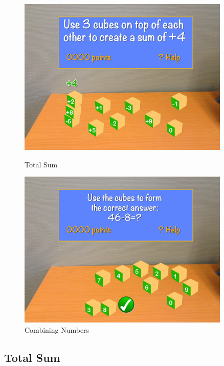 \begin{figure}[h]
	\capstart
	\centering
	\begin{minipage}{.5\textwidth}
		\capstart
		\centering
		\includegraphics[width=0.9\textwidth]{images/Costas/game_mockup2(arithmetic).jpg}
		\vspace{-10pt}
		\caption{Total Sum}
		\label{fig:Costas_total_sum}
	\end{minipage}%
	\begin{minipage}{.5\textwidth}
		\capstart
		\centering
		\includegraphics[width=0.9\textwidth]{images/Costas/game_mockup2(arithmetic2).jpg}
		\vspace{-10pt}
		\caption{Combining Numbers}
		\label{fig:Costas_combining_numbers}
	\end{minipage}%
	\label{fig:pair_games}
\end{figure}


\subsection{Total Sum}
\label{game:total_sum}

